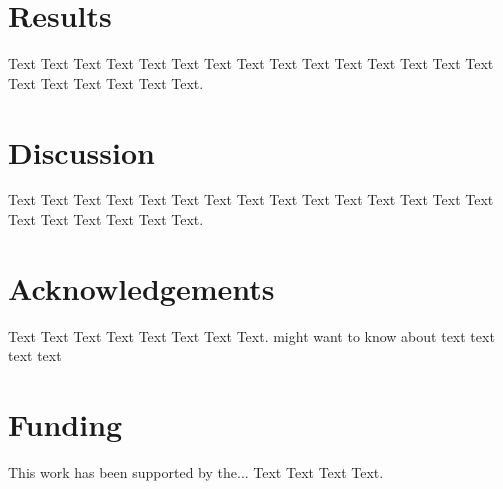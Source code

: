 \documentclass{bioinfo}
\begin{document}
    \section{Results}

    Text Text Text Text Text Text Text Text Text Text Text Text Text
    Text Text Text Text Text Text Text Text.


%
%

    \section{Discussion}

    Text Text Text Text Text Text Text Text Text Text Text Text Text
    Text Text Text Text Text Text Text Text.

    \section*{Acknowledgements}

    Text Text Text Text Text Text Text Text.  \citealp{Boffelli03} might want to know about text
    text text text\vspace*{-12pt}

    \section*{Funding}

    This work has been supported by the... Text Text Text Text.\vspace*{-12pt}

%
%
%
%
%
%
%
%
%
\end{document}
